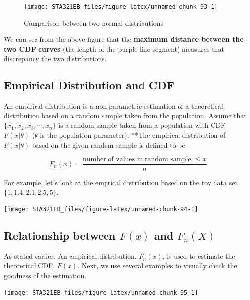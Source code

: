 \documentclass[
]{book}
\begin{document}
\begin{figure}

{\centering \texttt{[image: STA321EB\_files/figure-latex/unnamed-chunk-93-1]} 

}

\caption{Comparison between two normal distributions}\label{fig:unnamed-chunk-93}
\end{figure}

We can see from the above figure that the \textbf{maximum distance between the two CDF curves} (the length of the purple line segment) measures that discrepancy the two distributions.

\hypertarget{empirical-distribution-and-cdf}{%
\subsection{Empirical Distribution and CDF}\label{empirical-distribution-and-cdf}}

An empirical distribution is a non-parametric estimation of a theoretical distribution based on a random sample taken from the population. Assume that \(\{x_1, x_2, x_3, \cdots, x_n \}\) is a random sample taken from a population with CDF \(F(x|\theta)\) (\(\theta\) is the population parameter). **The empirical distribution of \(F(x|\theta)\) based on the given random sample is defined to be

\[
F_n(x) = \frac{\text{number of values in random sample } \le x}{n}
\]

For example, let's look at the emprical distribution based on the toy data set \(\{ 1, 1.4, 2.1, 2.5, 5\}\).

\begin{center}\texttt{[image: STA321EB\_files/figure-latex/unnamed-chunk-94-1]} \end{center}

\hypertarget{relationship-between-fx-and-f_nx}{%
\subsection{\texorpdfstring{Relationship between \(F(x)\) and \(F_n(X)\)}{Relationship between F(x) and F\_n(X)}}\label{relationship-between-fx-and-f_nx}}

As stated earlier, An empirical distribution, \(F_n(x)\), is used to estimate the theoretical CDF, \(F(x)\). Next, we use several examples to visually check the goodness of the estimation.

\begin{center}\texttt{[image: STA321EB\_files/figure-latex/unnamed-chunk-95-1]} \end{center}
\end{document}
